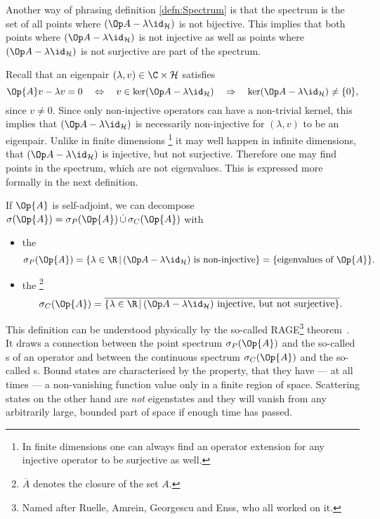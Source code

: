 Another way of phrasing definition \vref{defn:Spectrum} is that
the spectrum is the set of all points where $\shiftop$ is not bijective.
This implies that both points where $\shiftop$ is not injective
as well as points where $\shiftop$ is not surjective are part of the spectrum.

Recall that an eigenpair $(\lambda, v) \in \C \times \hilbert$ satisfies
\[ \Op{A} v - \lambda v = 0 \quad \Leftrightarrow \quad v \in \ker \shiftop \quad \Rightarrow \quad \ker \shiftop \neq \{0\}, \]
since $v \neq 0$.
Since only non-injective operators can have a non-trivial kernel,
this implies that $\shiftop$ is necessarily non-injective
for $(\lambda, v)$ to be an eigenpair.
Unlike in finite dimensions%
\footnote{In finite dimensions one can always find an operator extension for any
injective operator to be surjective as well.}
it may well happen in infinite dimensions, that $\shiftop$ is injective,
but not surjective.
Therefore one may find points in the spectrum, which are not eigenvalues.
This is expressed more formally in the next definition.

\begin{defn}
	If $\Op{A}$ is self-adjoint, we can decompose
	$\sigma(\Op{A}) = \sigma_P(\Op{A}) \, \dot{\cup} \, \sigma_C(\Op{A})$
	with
	\begin{itemize}
		\item the 
			\[ \sigma_P(\Op{A}) = \left\{ \lambda \in \R \, \middle|
				\, \shiftop\ \text{is non-injective} \right\}
				= \{ \text{eigenvalues of $\Op{A}$} \}.\]
		\item the %
			\footnote{$\overline{A}$ denotes the closure of the set $A$.}
			\[ \sigma_C(\Op{A}) = \overline{\left\{ \lambda \in \R \, \middle|\, \shiftop\ \text{injective, but not surjective} \right\}}.\]
	\end{itemize}
\end{defn}
This definition can be understood physically by the so-called
RAGE\footnote{Named after Ruelle, Amrein, Georgescu and Enss, who all worked on it.}
theorem~\cite{Last1996}.
It draws
a connection between the point spectrum $\sigma_P(\Op{A})$
and the so-called s of an operator
and between the continuous spectrum $\sigma_C(\Op{A})$
and the so-called s.
Bound states are characterised by the property,
that they have --- at all times --- a non-vanishing function value
only in a finite region of space.
Scattering states on the other hand are \emph{not} eigenstates
and they will vanish from any arbitrarily large, bounded part of space
if enough time has passed.

